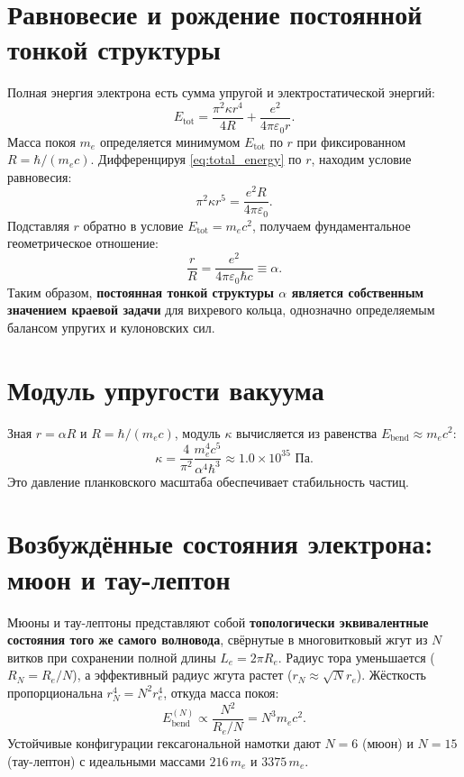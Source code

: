 \documentclass[12pt,a4paper]{article}
\begin{document}
\section{Равновесие и рождение постоянной тонкой структуры}

Полная энергия электрона есть сумма упругой и электростатической энергий:
\begin{equation}
E_{\text{tot}} = \frac{\pi^2 \kappa r^4}{4R} + \frac{e^2}{4\pi\varepsilon_0 r}.
\label{eq:total_energy}
\end{equation}
Масса покоя $m_e$ определяется минимумом $E_{\text{tot}}$ по $r$ при фиксированном $R = \hbar/(m_e c)$. Дифференцируя \eqref{eq:total_energy} по $r$, находим условие равновесия:
\begin{equation}
\pi^2 \kappa r^5 = \frac{e^2 R}{4\pi\varepsilon_0}.
\label{eq:equilibrium}
\end{equation}
Подставляя $r$ обратно в условие $E_{\text{tot}} = m_e c^2$, получаем фундаментальное геометрическое отношение:
\begin{equation}
\frac{r}{R} = \frac{e^2}{4\pi\varepsilon_0 \hbar c} \equiv \alpha.
\label{eq:alpha_val}
\end{equation}
Таким образом, \textbf{постоянная тонкой структуры $\alpha$ является собственным значением краевой задачи} для вихревого кольца, однозначно определяемым балансом упругих и кулоновских сил.

\section{Модуль упругости вакуума}

Зная $r = \alpha R$ и $R = \hbar/(m_e c)$, модуль $\kappa$ вычисляется из равенства $E_{\text{bend}} \approx m_e c^2$:
\begin{equation}
\kappa = \frac{4}{\pi^2} \frac{m_e^4 c^5}{\alpha^4 \hbar^3} \approx 1.0 \times 10^{35} \text{ Па}.
\label{eq:kappa_exact}
\end{equation}
Это давление планковского масштаба обеспечивает стабильность частиц.

\section{Возбуждённые состояния электрона: мюон и тау-лептон}

Мюоны и тау-лептоны представляют собой \textbf{топологически эквивалентные состояния того же самого волновода}, свёрнутые в многовитковый жгут из $N$ витков при сохранении полной длины $L_e = 2\pi R_e$.
Радиус тора уменьшается ($R_N = R_e/N$), а эффективный радиус жгута растет ($r_N \approx \sqrt{N} r_e$). Жёсткость пропорциональна $r_N^4 = N^2 r_e^4$, откуда масса покоя:
\begin{equation}
E_{\text{bend}}^{(N)} \propto \frac{N^2}{R_e/N} = N^3 m_e c^2.
\label{eq:E_bend_N}
\end{equation}
Устойчивые конфигурации гексагональной намотки дают $N = 6$ (мюон) и $N = 15$ (тау-лептон) с идеальными массами $216\,m_e$ и $3375\,m_e$.
\end{document}
